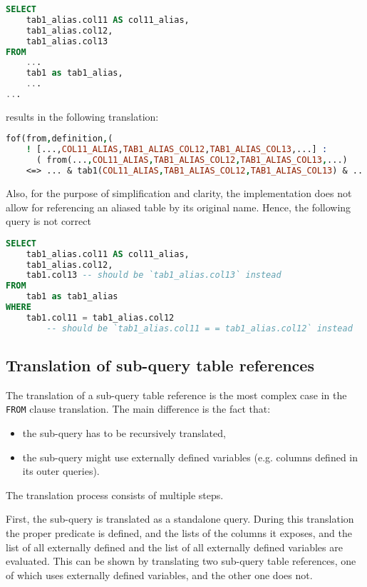 \documentclass[magisterska,en]{pracamgr}
\newcommand{\code}[1]{\texttt{#1}}
\begin{document}
\begin{lstlisting}[language=SQL]
SELECT
    tab1_alias.col11 AS col11_alias,
    tab1_alias.col12,
    tab1_alias.col13
FROM
    ...
    tab1 as tab1_alias,
    ...
...
\end{lstlisting}
results in the following translation:

\begin{lstlisting}[language=Prolog]
fof(from,definition,(
    ! [...,COL11_ALIAS,TAB1_ALIAS_COL12,TAB1_ALIAS_COL13,...] :
      ( from(...,COL11_ALIAS,TAB1_ALIAS_COL12,TAB1_ALIAS_COL13,...)
    <=> ... & tab1(COL11_ALIAS,TAB1_ALIAS_COL12,TAB1_ALIAS_COL13) & ...) )).
\end{lstlisting}

Also, for the purpose of simplification and clarity, the implementation does not allow for referencing an aliased table by its original name. Hence, the following query is not correct

\begin{lstlisting}[language=SQL]
SELECT
    tab1_alias.col11 AS col11_alias,
    tab1_alias.col12,
    tab1.col13 -- should be `tab1_alias.col13` instead
FROM
    tab1 as tab1_alias
WHERE
    tab1.col11 = tab1_alias.col12
        -- should be `tab1_alias.col11 = = tab1_alias.col12` instead
\end{lstlisting}


\subsection{Translation of sub-query table references}

The translation of a sub-query table reference is the most complex case in the \code{FROM} clause translation. The main difference is the fact that:
\begin{itemize}
    \item the sub-query has to be recursively translated,
    \item the sub-query might use externally defined variables (e.g. columns defined in its outer queries).
\end{itemize}

The translation process consists of multiple steps.

First, the sub-query is translated as a standalone query. During this translation the proper predicate is defined, and the lists of the columns it exposes, and the list of all externally defined and the list of all externally defined variables are evaluated. This can be shown by translating two sub-query table references, one of which uses externally defined variables, and the other one does not.
\end{document}
